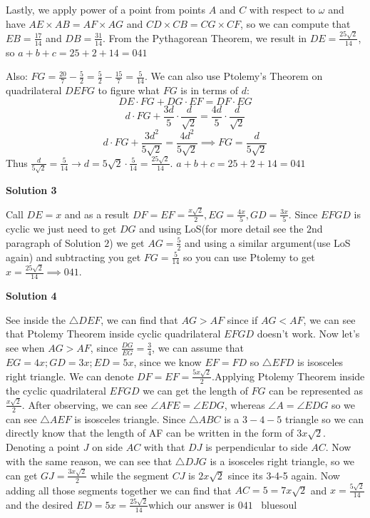 \begin{enumerate}
 Lastly, we apply power of a point from points $A$ and $C$ with respect to $\omega$ and have $AE \times AB=AF \times AG$ and $CD \times CB=CG \times CF$, so we can compute that $EB = \frac{17}{14}$ and $DB = \frac{31}{14}$. From the Pythagorean Theorem, we result in $DE = \frac{25 \sqrt{2}}{14}$, so $a+b+c=25+2+14= \boxed{041}$

 
Also: $FG=\frac{20}{7}-\frac{5}{2}=\frac{5}{2}-\frac{15}{7}=\frac{5}{14}$. We can also use Ptolemy's Theorem on quadrilateral $DEFG$ to figure what $FG$ is in terms of $d$:
 \[DE\cdot FG+DG\cdot EF=DF\cdot EG\]
 \[d\cdot FG+\frac{3d}{5}\cdot \frac{d}{\sqrt{2}}=\frac{4d}{5}\cdot \frac{d}{\sqrt{2}}\]
 \[d\cdot FG+\frac{3d^2}{5\sqrt{2}}=\frac{4d^2}{5\sqrt{2}}\implies FG=\frac{d}{5\sqrt{2}}\]Thus $\frac{d}{5\sqrt{2}}=\frac{5}{14}\rightarrow d=5\sqrt{2}\cdot\frac{5}{14}=\frac{25\sqrt{2}}{14}$. $a+b+c=25+2+14= \boxed{041}$




\textbf{Solution 3}

Call $DE=x$ and as a result $DF=EF=\frac{x\sqrt{2}}{2}, EG=\frac{4x}{5}, GD=\frac{3x}{5}$. Since $EFGD$ is cyclic we just need to get $DG$ and using LoS(for more detail see the $2$nd paragraph of Solution $2$) we get $AG=\frac{5}{2}$ and using a similar argument(use LoS again) and subtracting you get $FG=\frac{5}{14}$ so you can use Ptolemy to get $x=\frac{25\sqrt{2}}{14} \implies \boxed{041}$.~

 



\textbf{Solution 4}

See inside the $\triangle DEF$, we can find that $AG>AF$ since if $AG<AF$, we can see that Ptolemy Theorem inside cyclic quadrilateral $EFGD$ doesn't work. Now let's see when $AG>AF$, since  $\frac{DG}{EG} = \frac{3}{4}$, we can assume that $EG=4x;GD=3x;ED=5x$, since we know $EF=FD$ so $\triangle EFD$ is isosceles right triangle. We can denote $DF=EF=\frac{5x\sqrt{2}}{2}$.Applying Ptolemy Theorem inside the cyclic quadrilateral $EFGD$ we can get the length of $FG$ can be represented as $\frac{x\sqrt{2}}{2}$. After observing, we can see $\angle AFE=\angle EDG$, whereas $\angle A=\angle EDG$ so we can see $\triangle AEF$ is isosceles triangle. Since $\triangle ABC$ is a $3-4-5$ triangle so we can directly know that the length of AF can be written in the form of $3x\sqrt{2}$. Denoting a point $J$ on side $AC$ with that $DJ$ is perpendicular to side $AC$. Now with the same reason, we can see that $\triangle DJG$ is a isosceles right triangle, so we can get $GJ=\frac{3x\sqrt{2}}{2}$ while the segment $CJ$ is $2x\sqrt{2}$ since its 3-4-5 again. Now adding all those segments together we can find that $AC=5=7x\sqrt{2}$ and $x=\frac{5\sqrt{2}}{14}$ and the desired $ED=5x=\frac{25\sqrt{2}}{14}$which our answer is $\boxed{041}$ ~bluesoul


\end{enumerate}
